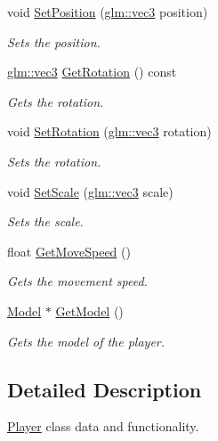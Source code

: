 \begin{CompactItemize}
void \hyperlink{class_player_2a58860a7169ad27fbb1eec6a64fc31b}{SetPosition} (\hyperlink{group__core__types_g1c47e8b3386109bc992b6c48e91b0be7}{glm::vec3} position)
\begin{CompactList}\small\item\em Sets the position. \item\end{CompactList}\item 
\hyperlink{group__core__types_g1c47e8b3386109bc992b6c48e91b0be7}{glm::vec3} \hyperlink{class_player_df9696bac0f5ef8d18b7faff9b75e21e}{GetRotation} () const 
\begin{CompactList}\small\item\em Gets the rotation. \item\end{CompactList}\item 
void \hyperlink{class_player_2e3d2df5baf6a9b83e06bcae3aaeccd6}{SetRotation} (\hyperlink{group__core__types_g1c47e8b3386109bc992b6c48e91b0be7}{glm::vec3} rotation)
\begin{CompactList}\small\item\em Sets the rotation. \item\end{CompactList}\item 
void \hyperlink{class_player_454ad879bdf9073c89b1055647e6f8c6}{SetScale} (\hyperlink{group__core__types_g1c47e8b3386109bc992b6c48e91b0be7}{glm::vec3} scale)
\begin{CompactList}\small\item\em Sets the scale. \item\end{CompactList}\item 
float \hyperlink{class_player_f0f47c5d51eeb711111f692595d211d5}{GetMoveSpeed} ()
\begin{CompactList}\small\item\em Gets the movement speed. \item\end{CompactList}\item 
\hyperlink{class_model}{Model} $\ast$ \hyperlink{class_player_26741893f9eb0aeb01ead80a8bcf851f}{GetModel} ()
\begin{CompactList}\small\item\em Gets the model of the player. \item\end{CompactList}\end{CompactItemize}


\subsection{Detailed Description}
\hyperlink{class_player}{Player} class data and functionality. 

